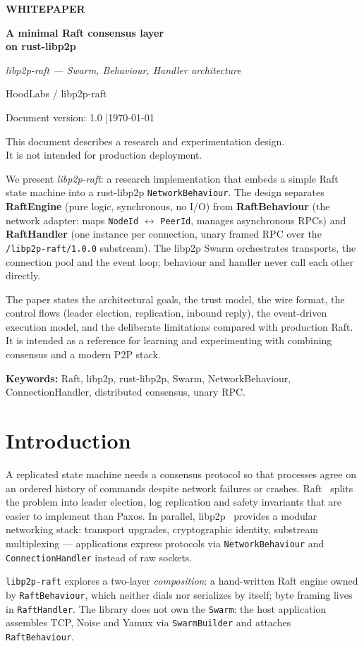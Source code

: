 \documentclass[11pt,a4paper]{article}
\newcommand{\WhitepaperTitle}{%
  \begin{titlepage}
    \centering
    \vspace*{1.5cm}
    {\LARGE\bfseries\color{brand} WHITEPAPER\par}
    \vspace{0.6cm}
    {\Huge\bfseries A minimal Raft consensus layer\\on rust-libp2p\par}
    \vspace{0.4cm}
    {\large\textit{libp2p-raft --- Swarm, Behaviour, Handler architecture}\par}
    \vspace{2cm}
    {\large HoodLabs / libp2p-raft\par}
    \vspace{0.3cm}
    {\normalsize\textcolor{muted}{Document version: 1.0 \quad|\quad \today}\par}
    \vfill
    {\small\textcolor{muted}%
      This document describes a research and experimentation design.\\
      It is not intended for production deployment.\par}
  \end{titlepage}
}
\renewenvironment{abstract}{%
  \begin{center}\bfseries\abstractname\end{center}\vspace{-0.5em}\noindent\ignorespaces
}{\par\medskip}
\newcommand{\code}[1]{{\def\_{\textunderscore\allowbreak}\texttt{#1}}}
\begin{document}
\WhitepaperTitle

\begin{abstract}
\noindent
We present \emph{libp2p-raft}: a research implementation that embeds a simple Raft state machine
into a rust-libp2p \code{NetworkBehaviour}. The design separates \textbf{RaftEngine}
(pure logic, synchronous, no I/O) from \textbf{RaftBehaviour} (the network adapter: maps
\code{NodeId} $\leftrightarrow$ \code{PeerId}, manages asynchronous RPCs) and
\textbf{RaftHandler} (one instance per connection, unary framed RPC over the
\code{/libp2p-raft/1.0.0} substream). The libp2p Swarm orchestrates transports, the connection
pool and the event loop; behaviour and handler never call each other directly.

The paper states the architectural goals, the trust model, the wire format, the control flows
(leader election, replication, inbound reply), the event-driven execution model, and the
deliberate limitations compared with production Raft. It is intended as a reference for learning
and experimenting with combining consensus and a modern P2P stack.
\end{abstract}

\noindent\textbf{Keywords:} Raft, libp2p, rust-libp2p, Swarm, NetworkBehaviour,
ConnectionHandler, distributed consensus, unary RPC.

\tableofcontents
\newpage

\section{Introduction}

A replicated state machine needs a consensus protocol so that processes agree on an ordered
history of commands despite network failures or crashes. Raft~\cite{ongaro2014raft} splits the
problem into leader election, log replication and safety invariants that are easier to implement
than Paxos. In parallel, libp2p~\cite{libp2p} provides a modular networking stack: transport
upgrades, cryptographic identity, substream multiplexing --- applications express protocols via
\code{NetworkBehaviour} and \code{ConnectionHandler} instead of raw sockets.

\code{libp2p-raft} explores a two-layer \emph{composition}: a hand-written Raft engine owned by
\code{RaftBehaviour}, which neither dials nor serializes by itself; byte framing lives in
\code{RaftHandler}. The library does not own the \code{Swarm}: the host application assembles
TCP, Noise and Yamux via \code{SwarmBuilder} and attaches \code{RaftBehaviour}.
\end{document}
